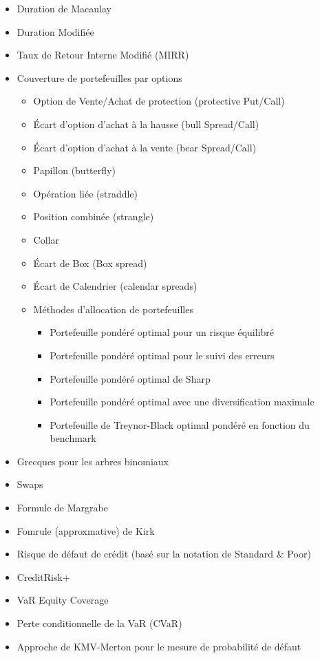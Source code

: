 \begin{itemize}
\begin{itemize}
				\item Duration de Macaulay
				\item Duration Modifiée
				\item Taux de Retour Interne Modifié (MIRR)
				\item Couverture de portefeuilles par options
				\begin{itemize}
					\item Option de Vente/Achat de protection (protective Put/Call)
					\item Écart d'option d'achat à la hausse (bull Spread/Call)
					\item Écart d'option d'achat à la vente (bear Spread/Call)
					\item Papillon (butterfly)
					\item Opération liée (straddle)
					\item Position combinée (strangle)
					\item Collar
					\item Écart de Box (Box spread)
					\item Écart de Calendrier (calendar spreads)
					\item Méthodes d'allocation de portefeuilles
					\begin{itemize}
						\item Portefeuille pondéré optimal pour un risque équilibré
						\item Portefeuille pondéré optimal pour le suivi des erreurs
						\item Portefeuille pondéré optimal de Sharp
						\item Portefeuille pondéré optimal avec une diversification maximale
						\item Portefeuille de Treynor-Black optimal pondéré en fonction du benchmark
					\end{itemize}
				\end{itemize}
				\item Grecques pour les arbres binomiaux
				\item Swaps
				\item Formule de Margrabe
				\item Fomrule (approxmative) de Kirk
				\item Risque de défaut de crédit (basé sur la notation de Standard \& Poor)
				\item CreditRisk+
				\item VaR Equity Coverage
				\item Perte conditionnelle de la VaR (CVaR)
				\item Approche de KMV-Merton pour le mesure de probabilité de défaut

\end{itemize}
\end{itemize}
